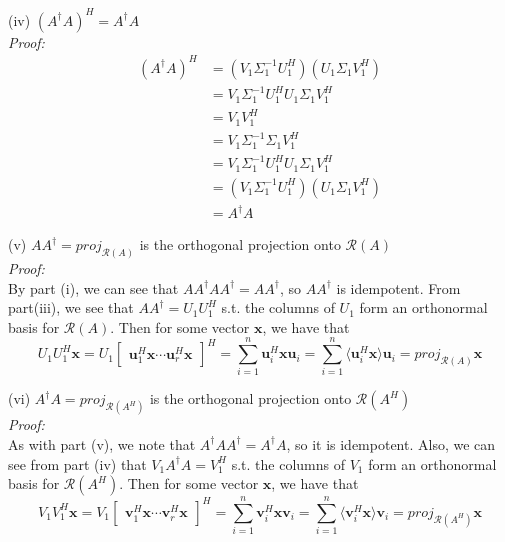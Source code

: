 \documentclass[letterpaper,12pt]{article}
\let\vec\mathbf
\theoremstyle{definition}
\begin{document}
(iv) $(A^\dagger A)^H = A^\dagger A $ \\
\textit{Proof:}
\begin{align*}
  (A^\dagger A)^H &= (V_1 \Sigma_1^{-1} U_1^H)(U_1 \Sigma_1 V_1^H) \\
  &= V_1 \Sigma_1^{-1} U_1^H U_1 \Sigma_1 V_1^H \\
  &= V_1 V_1^H \\
  &= V_1 \Sigma_1^{-1} \Sigma_1 V_1^H \\
  &= V_1 \Sigma_1^{-1} U_1^H U_1 \Sigma_1 V_1^H \\
  &= (V_1 \Sigma_1^{-1} U_1^H)(U_1 \Sigma_1 V_1^H) \\
  &= A^\dagger A
\end{align*}

(v) $AA^\dagger = proj_{\mathscr{R}(A)}$ is the orthogonal projection onto $\mathscr{R}(A)$ \\
\textit{Proof:} \\
By part (i), we can see that $AA^\dagger AA^\dagger = AA^\dagger$, so $AA^\dagger$ is idempotent. From part(iii), we see that $AA^\dagger = U_1 U_1^H$ s.t. the columns of $U_1$ form an orthonormal basis for $\mathscr{R}(A)$. Then for some vector $\vec{x}$, we have that
\[U_1 U_1^H \vec{x} = U_1
\begin{bmatrix}
  \vec{u}_1^H\vec{x} \cdots \vec{u}_r^H\vec{x}
\end{bmatrix}^H
= \sum_{i=1}^n \vec{u}_i^H\vec{x}\vec{u}_i
= \sum_{i=1}^n \langle\vec{u}_i^H\vec{x}\rangle\vec{u}_i = proj_{\mathscr{R}(A)} \vec{x}
\]

(vi) $A^\dagger A = proj_{\mathscr{R}(A^H)}$ is the orthogonal projection onto $\mathscr{R}(A^H)$\\
\textit{Proof:} \\
As with part (v), we note that $A^\dagger A A^\dagger = A^\dagger A$, so it is idempotent. Also, we can see from part (iv) that $V_1 A^\dagger A = V_1^H$ s.t. the columns of $V_1$ form an orthonormal basis for $\mathscr{R}(A^H)$. Then for some vector $\vec{x}$, we have that
\[V_1 V_1^H \vec{x} = V_1
\begin{bmatrix}
  \vec{v}_1^H\vec{x} \cdots \vec{v}_r^H\vec{x}
\end{bmatrix}^H
= \sum_{i=1}^n \vec{v}_i^H\vec{x}\vec{v}_i
= \sum_{i=1}^n \langle\vec{v}_i^H\vec{x}\rangle\vec{v}_i = proj_{\mathscr{R}(A^H)} \vec{x}
\]
\end{document}
